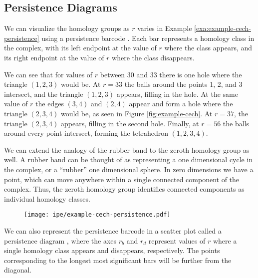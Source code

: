 \subsection{Persistence Diagrams}

We can visualize the homology groups as \(r\) varies in Example \ref{exa:example-cech-persistence} using a persistence barcode .
Each bar represents a homology class in the complex, with its left endpoint at the value of \(r\) where the class appears, and its right endpoint at the value of \(r\) where the class disappears.

We can see that for values of \(r\) between 30 and 33 there is one hole where the triangle \((1,2,3)\) would be.
At \(r=33\) the balls around the points 1, 2, and 3 intersect, and the triangle \((1,2,3)\) appears, filling in the hole.
At the same value of \(r\) the edges \((3,4)\) and \((2,4)\) appear and form a hole where the triangle \((2,3,4)\) would be, as seen in Figure \ref{fig:example-cech}.
At \(r=37\), the triangle \((2,3,4)\) appears, filling in the second hole.
Finally, at \(r=56\) the balls around every point intersect, forming the tetrahedron \((1,2,3,4)\).

We can extend the analogy of the rubber band to the zeroth homology group as well.
A rubber band can be thought of as representing a one dimensional cycle in the complex, or a ``rubber'' one dimensional sphere.
In zero dimensions we have a point, which can move anywhere within a single connected component of the complex.
Thus, the zeroth homology group identifies connected components as individual homology classes.

\begin{figure}
    \centering
    \texttt{[image: ipe/example-cech-persistence.pdf]}
    \caption{}
    \label{fig:example-cech-persistence}
\end{figure}

We can also represent the persistence barcode in a scatter plot called a persistence diagram , where the axes \(r_b\) and \(r_d\) represent values of \(r\) where a single homology class appears and disappears, respectively.
The points corresponding to the longest most significant bars will be further from the diagonal.


